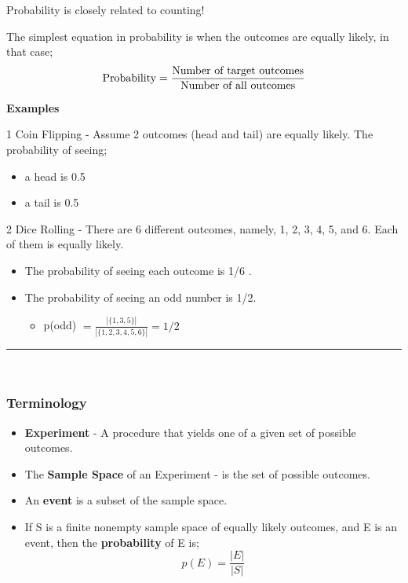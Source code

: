 \documentclass[12pt, letterpaper]{article}
\newcommand{\exheader}[1][ex]{{\tiny{#1}\normalsize}}
\newcommand{\horizline}[0]{\noindent\rule{\textwidth}{1pt}\\}
\begin{document}
Probability is closely related to counting! 

The simplest equation in probability is when the outcomes are equally likely, in that case; \\ \[ \textnormal{Probability} = \frac{\textnormal{Number of target outcomes}}{\textnormal{Number of all outcomes}}  \]

\textbf{Examples} \bigbreak

\exheader[1] Coin Flipping - Assume 2 outcomes (head and tail) are equally likely. The probability of seeing;
\begin{itemize}[leftmargin=*,  label={}]
	\item a head is 0.5
	\item a tail is 0.5
\end{itemize}

\bigbreak

\exheader[2] Dice Rolling - There are 6 different outcomes, namely, 1, 2, 3, 4, 5, and 6. Each of them is equally likely.
\begin{itemize}[leftmargin=*,  label={}]
	\item The probability of seeing each outcome is 1/6 .
	\item The probability of seeing an odd number is 1/2.
	\begin{itemize}
		\item p(odd) $= \frac{|\{1,3,5\}|}{|\{1,2,3,4,5,6\}|} = 1/2$
	\end{itemize}
\end{itemize}

\horizline

\subsubsection*{Terminology} 
\begin{itemize}[leftmargin=*,  label={}]
	\item \textbf{Experiment} - A procedure that yields one of a given set of possible outcomes.
	\item The \textbf{Sample Space} of an Experiment - is the set of possible outcomes.
	\item An \textbf{event} is a subset of the sample space.
	\item If S is a finite nonempty sample space of equally likely outcomes, and E is an event, then the \textbf{probability} of E is; \[p(E) = \frac{|E|}{|S|}\]
\end{itemize}

\pagebreak
\end{document}
